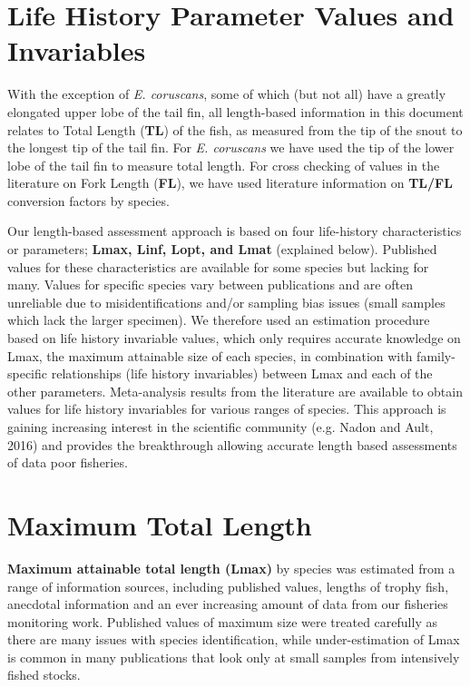 \section{Life History Parameter Values and Invariables}
With the exception of \textit{E. coruscans}, some of which (but not all) have a greatly elongated upper lobe of the tail fin, all length-based information in this document relates to Total Length (\textbf{TL}) of the fish, as measured from the tip of the snout to the longest tip of the tail fin. For \textit{E. coruscans} we have used the tip of the lower lobe of the tail fin to measure total length. For cross checking of values in the literature on Fork Length (\textbf{FL}), we have used literature information on \textbf{TL/FL} conversion factors by species.

Our length-based assessment approach is based on four life-history characteristics or parameters; \textbf{Lmax, Linf, Lopt, and Lmat} (explained below). Published values for these characteristics are available for some species but lacking for many. Values for specific species vary between publications and are often unreliable due to misidentifications and/or sampling bias issues (small samples which lack the larger specimen). We therefore used an estimation procedure based on life history invariable values, which only requires accurate knowledge on Lmax, the maximum attainable size of each species, in combination with family-specific relationships (life history invariables) between Lmax and each of the other parameters. Meta-analysis results from the literature are available to obtain values for life history invariables for various ranges of species. This approach is gaining increasing interest in the scientific community (e.g. Nadon and Ault, 2016) and provides the breakthrough allowing accurate length based assessments of data poor fisheries.

\section{Maximum Total Length}
\textbf{Maximum attainable total length (Lmax)} by species was estimated from a range of information sources, including published values, lengths of trophy fish, anecdotal information and an ever increasing amount of data from our fisheries monitoring work. Published values of maximum size were treated carefully as there are many issues with species identification, while under-estimation of Lmax is common in many publications that look only at small samples from intensively fished stocks.

